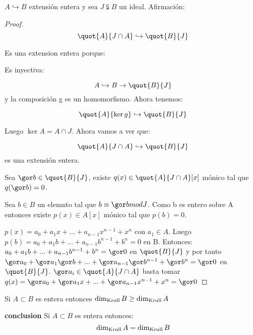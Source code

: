 \obs
$A \hookrightarrow B$ extensión entera y sea $J \subsetneqq B$ un ideal. Afirmación:

\begin{proof}
$$\quot{A}{J \cap A} \hookrightarrow \quot{B}{J}$$

Es una extension entera porque:

Es inyectiva:

$$ A \hookrightarrow B \rightarrow \quot{B}{J}$$ y la composición g es un homomorfismo. Ahora tenemos:

$$\quot{A}{\ker g} \hookrightarrow \quot{B}{J}$$

Luego $\ker A=A \cap J$. Ahora vamos a ver que:

$$ \quot{A}{J \cap A} \hookrightarrow \quot{B}{J}$$ es una extensión entera.

Sea $\cls{b} \in \quot{B}{J}$, existe $q(x) \in \quot{A}{J \cap A}[x]$ mónico tal que $q(\cls{b})=0$.


Sea $b \in B$ un elemnto tal que $b \equiv \cls{b} mod J$. Como b es entero sobre A entonces existe $p(x) \in A[x]$ mónico tal que $p(b)=0$.

$p(x) = a_0+a_1x+...+a_{n-1}x^{n-1}+x^n$ con $a_1 \in A$. Luego $p(b) = a_0+a_1b+...+a_{n-1}b^{n-1}+b^n=0$ en B. Entonces: $a_0+a_1b+...+a_{n-1}b^{n-1}+b^n=\cls{0}$ en $\quot{B}{J}$ y por tanto $\cls{a_0}+\cls{a_1}\cls{b}+...+\cls{a_{n-1}}\cls{b^{n-1}}+\cls{b}^n=\cls{0}$  en $\quot{B}{J}$. $\cls{a_i} \in \quot{A}{J \cap A}$ basta tomar $q(x)=\cls{a_0}+\cls{a_1}x+...+\cls{a_{n-1}}x^{n-1}+x^n=\cls{0}$
\end{proof}

\begin{corol} \label{crl:DimKrullExtensionIgual}
	Si $A \subset B$ es entera entonces $\dim_{\mathrm{Krull}} B \geq \dim_{\mathrm{Krull}} A$
\end{corol}

\textbf{conclusion} Si $A \subset B$ es entera entonces:
$$ \dim_{\mathrm{Krull}} A = \dim_{\mathrm{Krull}} B $$

